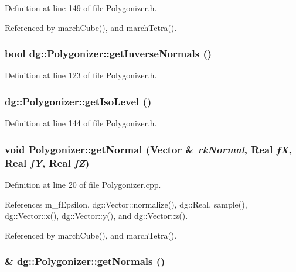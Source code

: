 Definition at line 149 of file Polygonizer.h.

Referenced by march\-Cube(), and march\-Tetra().
\subsubsection{\setlength{\rightskip}{0pt plus 5cm}bool dg::Polygonizer::get\-Inverse\-Normals ()\hspace{0.3cm}{\tt  [inline]}}\label{classdg_1_1Polygonizer_a4}




Definition at line 123 of file Polygonizer.h.
\subsubsection{ dg::Polygonizer::get\-Iso\-Level ()\hspace{0.3cm}{\tt  [inline]}}\label{classdg_1_1Polygonizer_a8}




Definition at line 144 of file Polygonizer.h.
\subsubsection{\setlength{\rightskip}{0pt plus 5cm}void Polygonizer::get\-Normal ({\bf Vector} \& {\em rk\-Normal}, {\bf Real} {\em f\-X}, {\bf Real} {\em f\-Y}, {\bf Real} {\em f\-Z})}\label{classdg_1_1Polygonizer_a20}




Definition at line 20 of file Polygonizer.cpp.

References m\_\-f\-Epsilon, dg::Vector::normalize(), dg::Real, sample(), dg::Vector::x(), dg::Vector::y(), and dg::Vector::z().

Referenced by march\-Cube(), and march\-Tetra().
\subsubsection{\& dg::Polygonizer::get\-Normals ()\hspace{0.3cm}{\tt  [inline]}}\label{classdg_1_1Polygonizer_a16}




